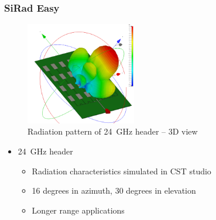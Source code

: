\documentclass[aspectratio=43]{beamer}
\begin{document}
\begin{frame}[fragile]
  \frametitle{SiRad Easy}

  \begin{figure}[h!]
    \centering
    \includegraphics[width=0.43\textwidth]{../img/farfield3d.png}
    \caption{Radiation pattern of 24~GHz header -- 3D view}
    \label{fig:farfield3d}
  \end{figure}

  \begin{itemize}
    \item 24~GHz header
      \begin{itemize}
        \item Radiation characteristics simulated in CST studio
        \item 16 degrees in azimuth, 30 degrees in elevation
        \item Longer range applications
      \end{itemize}
  \end{itemize}
\end{frame}
\end{document}
